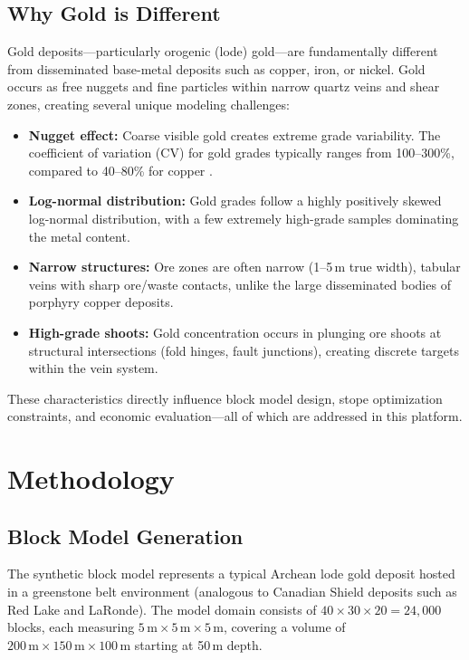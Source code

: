 \documentclass[12pt,a4paper]{article}
\begin{document}
\subsection{Why Gold is Different}

Gold deposits---particularly orogenic (lode) gold---are fundamentally different from disseminated base-metal deposits such as copper, iron, or nickel. Gold occurs as free nuggets and fine particles within narrow quartz veins and shear zones, creating several unique modeling challenges:

\begin{itemize}[itemsep=0.2em]
    \item \textbf{Nugget effect:} Coarse visible gold creates extreme grade variability. The coefficient of variation (CV) for gold grades typically ranges from 100--300\%, compared to 40--80\% for copper \cite{journel1978}.
    \item \textbf{Log-normal distribution:} Gold grades follow a highly positively skewed log-normal distribution, with a few extremely high-grade samples dominating the metal content.
    \item \textbf{Narrow structures:} Ore zones are often narrow (1--5\,m true width), tabular veins with sharp ore/waste contacts, unlike the large disseminated bodies of porphyry copper deposits.
    \item \textbf{High-grade shoots:} Gold concentration occurs in plunging ore shoots at structural intersections (fold hinges, fault junctions), creating discrete targets within the vein system.
\end{itemize}

These characteristics directly influence block model design, stope optimization constraints, and economic evaluation---all of which are addressed in this platform.

\section{Methodology}
\label{sec:methodology}

\subsection{Block Model Generation}
\label{sec:block-model}

The synthetic block model represents a typical Archean lode gold deposit hosted in a greenstone belt environment (analogous to Canadian Shield deposits such as Red Lake and LaRonde). The model domain consists of $40 \times 30 \times 20 = 24{,}000$ blocks, each measuring $5\,\text{m} \times 5\,\text{m} \times 5\,\text{m}$, covering a volume of $200\,\text{m} \times 150\,\text{m} \times 100\,\text{m}$ starting at 50\,m depth.
\end{document}

